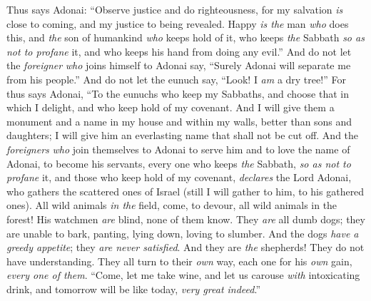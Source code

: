 \begin{biblechapter} %
 Thus says Adonai:
\verse “Observe justice 
and do righteousness, 
for my salvation \textit{is} close to coming, 
and my justice to being revealed.
\verse Happy \textit{is the} man \textit{who} does this, 
and \textit{the} son of humankind \textit{who} keeps hold of it, 
who keeps \textit{the} Sabbath \textit{so as not to profane} it, 
and who keeps his hand from doing any evil.”
\verse And do not let the \textit{foreigner} \textit{who} joins himself to Adonai say, “Surely Adonai will separate me from his people.” 
And do not let the eunuch say, “Look! I \textit{am} a dry tree!”
\verse For thus says Adonai, “To the eunuchs who keep my Sabbaths, 
and choose that in which I delight, 
and who keep hold of my covenant.
\verse And I will give them a monument and a name in my house and within my walls, 
better than sons and daughters; 
I will give him an everlasting name 
that shall not be cut off.
\verse And the \textit{foreigners} \textit{who} join themselves to Adonai to serve him 
and to love the name of Adonai, to become his servants, 
every one who keeps \textit{the} Sabbath, \textit{so as not to profane} it, 
and those who keep hold of my covenant,
\verse \textit{declares} the Lord Adonai, who gathers the scattered ones of Israel (still I will gather to him, to his gathered ones).
 All wild animals \textit{in the} field, come, 
to devour, all wild animals in the forest!
\verse His watchmen \textit{are} blind, 
none of them know. 
They \textit{are} all dumb dogs; 
they are unable to bark, 
panting, lying down, 
loving to slumber.
\verse And the dogs \textit{have a greedy appetite}; 
they \textit{are never satisfied}. 
And they are \textit{the} shepherds! 
They do not have understanding. 
They all turn to their \textit{own} way, 
each one for his \textit{own} gain, \textit{every one of them}.
\verse “Come, let me take wine, 
and let us carouse \textit{with} intoxicating drink, 
and tomorrow will be like today, 
\textit{very great indeed}.”
\end{biblechapter}

